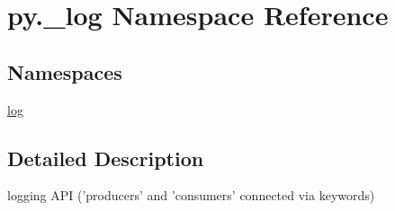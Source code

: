 \hypertarget{namespacepy_1_1__log}{}\section{py.\+\_\+log Namespace Reference}
\label{namespacepy_1_1__log}
\subsection*{Namespaces}
\begin{DoxyCompactItemize}
\item 
 \hyperlink{namespacepy_1_1__log_1_1log}{log}
\end{DoxyCompactItemize}


\subsection{Detailed Description}
\begin{DoxyVerb}logging API ('producers' and 'consumers' connected via keywords) \end{DoxyVerb}
 